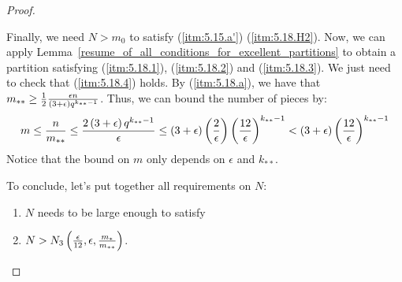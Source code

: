 \begin{proof}
\begin{itemize}[label={}]
            \end{itemize}
            Finally, we need $N > m_0$ to satisfy (\ref{itm:5.15.a'}) (\ref{itm:5.18.H2}).
            Now, we can apply Lemma~\ref{resume_of_all_conditions_for_excellent_partitions} to obtain a partition
            satisfying (\ref{itm:5.18.1}), (\ref{itm:5.18.2}) and (\ref{itm:5.18.3}).
            We just need to check that (\ref{itm:5.18.4}) holds.
            By (\ref{itm:5.18.a}), we have that $m_{**} \geq \frac{1}{2} \frac{\epsilon n}{\left( 3 + \epsilon \right)q^{k_{**}-1}}$.
            Thus, we can bound the number of pieces by:
            $$
                m \leq \frac{n}{m_{**}} \leq \frac{2 \left( 3 + \epsilon \right) q^{k_{**}-1}}{\epsilon} \leq
                    \left( 3 + \epsilon \right) \left( \frac{2}{\epsilon} \right) \left( \frac{12}{\epsilon} \right)^{k_{**}-1} <
                    \left( 3 + \epsilon \right) \left( \frac{12}{\epsilon} \right)^{k_{**}-1}
            $$
            Notice that the bound on $m$ only depends on $\epsilon$ and $k_{**}$.

            To conclude, let's put together all requirements on $N$:
            \begin{enumerate}[label=(H\arabic*), ref=H\arabic*]
                \item \label{itm:5.18.H1} $N$ needs to be large enough to satisfy
                \item \label{itm:5.18.H2} $N > N_3\left( \frac{\epsilon}{12}, \epsilon, \frac{m_*}{m_{**}} \right)$.
            \end{enumerate}
        \end{proof}



